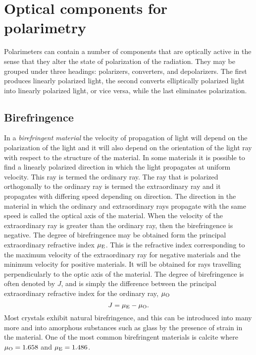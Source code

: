 \section{Optical components for polarimetry}

Polarimeters can contain a number of components that are optically active in the sense
that they alter the state of polarization of the radiation. They may be grouped under
three headings: polarizers, converters, and depolarizers. The first produces linearly 
polarized light, the second converts elliptically polarized light into linearly polarized light, or vice versa, while the last eliminates polarization. 

\subsection{Birefringence}

In a {\it birefringent material} the velocity of propagation of light will depend on the polarization of the light and it will also depend on the orientation of the light ray 
with respect to the structure of the material. In some materials it is possible to find 
a linearly polarized direction in which the light propagates at uniform velocity. This ray
is termed the ordinary ray. The ray that is polarized orthogonally to the ordinary ray is
termed the extraordinary ray and it propagates with differing speed depending on direction. The direction in the material in which the ordinary and extraordinary rays propagate with the same speed is called the optical axis of the material. When the 
velocity of the extraordinary ray is greater than the ordinary ray, then the birefringence is negative. The degree of birefringence may be obtained form the principal extraordinary 
refractive index $\mu_{\rm E}$. This is the refractive index corresponding to the maximum
velocity of the extraordinary ray for negative materials and the minimum velocity for
positive materials. It will be obtained for rays travelling perpendicularly to the optic axis of the material. The degree of birefringence is often denoted by $J$, and is simply the
difference between the principal extraordinary refractive index for the ordinary ray, $\mu_{\rm O}$
\[
J=\mu_{\rm E}-\mu_{\rm O}.
\]
\noindent
Most crystals exhibit natural birefringence, and this can be introduced into many more
and into amorphous substances such as glass by the presence of strain in the material. One of the most common birefringent materials is calcite where $\mu_{\rm O}=1.658$ and $\mu_{\rm E}=1.486$.

